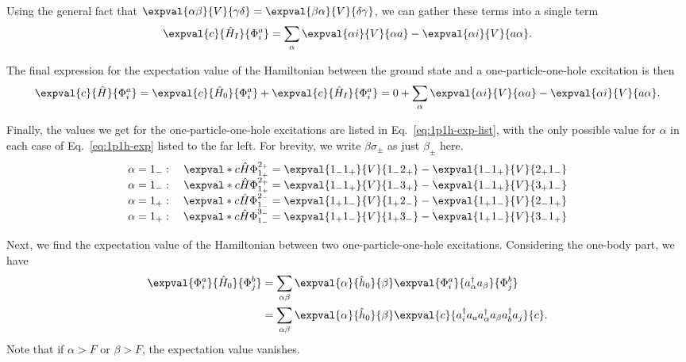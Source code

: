 Using the general fact that $\expval{\alpha \beta}{V}{\gamma \delta} = \expval{\beta \alpha}{V}{\delta \gamma}$, we can gather these terms into a single term
\begin{equation*}
    \expval{c}{\hat{H}_I}{\Phi_i^a} = \sum_{\alpha} \expval{\alpha i}{V}{\alpha a} - \expval{\alpha i}{V}{a \alpha}.
\end{equation*}

The final expression for the expectation value of the Hamiltonian between the ground state and a one-particle-one-hole excitation is then
\begin{equation}\label{eq:1p1h-exp}
    \expval{c}{\hat{H}}{\Phi_i^a} = \expval{c}{\hat{H}_0}{\Phi_i^a} + \expval{c}{\hat{H}_I}{\Phi_i^a} = 0 + \sum_{\alpha} \expval{\alpha i}{V}{\alpha a} - \expval{\alpha i}{V}{a \alpha}.
\end{equation}

Finally, the values we get for the one-particle-one-hole excitations are listed in Eq.~\eqref{eq:1p1h-exp-list}, with the only possible value for $\alpha$ in each case of Eq.~\eqref{eq:1p1h-exp} listed to the far left.
For brevity, we write $\beta\sigma_{\pm}$ as just $\beta_{\pm}$ here.
\begin{equation}\label{eq:1p1h-exp-list}
    \arraycolsep=1.4pt
    \begin{array}{crcl}
        \alpha = 1_{-}: \quad
        & \expval*{c}{\hat{H}}{\Phi_{1_{+}}^{2_{+}}}
        & = &
        \expval{1_{-} 1_{+}}{V}{1_{-} 2_{+}} - \expval{1_{-} 1_{+}}{V}{2_{+} 1_{-}} \\

        \alpha = 1_{-}: \quad
        & \expval*{c}{\hat{H}}{\Phi_{1_{+}}^{2_{+}}}
        & = &
        \expval{1_{-} 1_{+}}{V}{1_{-} 3_{+}} - \expval{1_{-} 1_{+}}{V}{3_{+} 1_{-}} \\

        \alpha = 1_{+}: \quad
        & \expval*{c}{\hat{H}}{\Phi_{1_{-}}^{2_{-}}}
        & = &
        \expval{1_{+} 1_{-}}{V}{1_{+} 2_{-}} - \expval{1_{+} 1_{-}}{V}{2_{-} 1_{+}} \\

        \alpha = 1_{+}: \quad
        & \expval*{c}{\hat{H}}{\Phi_{1_{-}}^{3_{-}}}
        & = &
        \expval{1_{+} 1_{-}}{V}{1_{+} 3_{-}} - \expval{1_{+} 1_{-}}{V}{3_{-} 1_{+}}
    \end{array}
\end{equation}

Next, we find the expectation value of the Hamiltonian between two one-particle-one-hole excitations.
Considering the one-body part, we have
\begin{align*}
    \expval{\Phi_i^a}{\hat{H}_0}{\Phi_j^b} &= \sum_{\alpha\beta} \expval{\alpha}{\hat{h}_0}{\beta} \expval{\Phi_i^a}{a_\alpha^\dagger a_\beta}{\Phi_j^b} \\
    &= \sum_{\alpha\beta} \expval{\alpha}{\hat{h}_0}{\beta} \expval{c}{a_i^\dagger a_a  a_\alpha^\dagger a_\beta a_b^\dagger a_j}{c}.
\end{align*}
Note that if $\alpha > F$ or $\beta > F$, the expectation value vanishes.

